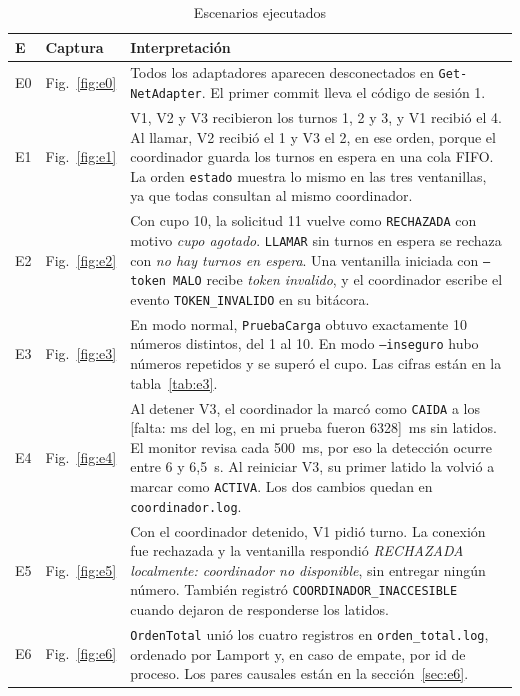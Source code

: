 \documentclass[11pt,a4paper]{article}
\begin{document}
\begin{table}[H]
\centering
\small
\begin{tabular}{@{}p{0.7cm}p{1.6cm}p{12.9cm}@{}}
\toprule
\textbf{E} & \textbf{Captura} & \textbf{Interpretación} \\
\midrule
E0 & Fig.~\ref{fig:e0} & Todos los adaptadores aparecen desconectados en \texttt{Get-NetAdapter}. El primer commit lleva el código de sesión 1. \\
E1 & Fig.~\ref{fig:e1} & V1, V2 y V3 recibieron los turnos 1, 2 y 3, y V1 recibió el 4. Al llamar, V2 recibió el 1 y V3 el 2, en ese orden, porque el coordinador guarda los turnos en espera en una cola FIFO. La orden \texttt{estado} muestra lo mismo en las tres ventanillas, ya que todas consultan al mismo coordinador. \\
E2 & Fig.~\ref{fig:e2} & Con cupo 10, la solicitud 11 vuelve como \texttt{RECHAZADA} con motivo \emph{cupo agotado}. \texttt{LLAMAR} sin turnos en espera se rechaza con \emph{no hay turnos en espera}. Una ventanilla iniciada con \texttt{--token MALO} recibe \emph{token invalido}, y el coordinador escribe el evento \texttt{TOKEN\_INVALIDO} en su bitácora. \\
E3 & Fig.~\ref{fig:e3} & En modo normal, \texttt{PruebaCarga} obtuvo exactamente 10 números distintos, del 1 al 10. En modo \texttt{--inseguro} hubo números repetidos y se superó el cupo. Las cifras están en la tabla~\ref{tab:e3}. \\
E4 & Fig.~\ref{fig:e4} & Al detener V3, el coordinador la marcó como \texttt{CAIDA} a los [falta: ms del log, en mi prueba fueron 6328]~ms sin latidos. El monitor revisa cada 500~ms, por eso la detección ocurre entre 6 y 6,5~s. Al reiniciar V3, su primer latido la volvió a marcar como \texttt{ACTIVA}. Los dos cambios quedan en \texttt{coordinador.log}. \\
E5 & Fig.~\ref{fig:e5} & Con el coordinador detenido, V1 pidió turno. La conexión fue rechazada y la ventanilla respondió \emph{RECHAZADA localmente: coordinador no disponible}, sin entregar ningún número. También registró \texttt{COORDINADOR\_INACCESIBLE} cuando dejaron de responderse los latidos. \\
E6 & Fig.~\ref{fig:e6} & \texttt{OrdenTotal} unió los cuatro registros en \texttt{orden\_total.log}, ordenado por Lamport y, en caso de empate, por id de proceso. Los pares causales están en la sección~\ref{sec:e6}. \\
\bottomrule
\end{tabular}
\caption{Escenarios ejecutados}
\end{table}
\end{document}
